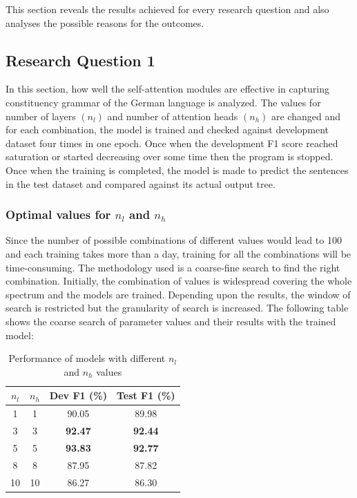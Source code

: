 \documentclass[a4paper, 11pt]{article}
\begin{document}
This section reveals the results achieved for every research question and also analyses the possible reasons for the outcomes.

\subsection{Research Question 1}

In this section, how well the self-attention modules are effective in capturing constituency grammar of the German language is analyzed. The values for number of layers $(n_l)$ and number of attention heads $(n_h)$ are changed and for each combination, the model is trained and checked against development dataset four times in one epoch. Once when the development F1 score reached saturation or started decreasing over some time then the program is stopped. Once when the training is completed, the model is made to predict the sentences in the test dataset and compared against its actual output tree. 

\subsubsection{Optimal values for $n_l$ and $n_h$}

Since the number of possible combinations of different values would lead to 100 and each training takes more than a day, training for all the combinations will be time-consuming. The methodology used is a coarse-fine search to find the right combination. Initially, the combination of values is widespread covering the whole spectrum and the models are trained. Depending upon the results, the window of search is restricted but the granularity of search is increased. The following table shows the coarse search of parameter values and their results with the trained model:

\begin{table}[h!]
  \begin{center}
    \label{tab:coarse_search_for_layers_heads}
    \def\arraystretch{1.5}%
    \begin{tabular}{c|c|c|c}
      \textbf{$n_l$} & \textbf{$n_h$} & Dev F1 (\%) & Test F1 (\%) \\
      \hline
      1 & 1 & 90.05 & 89.98\\
      3 & 3 & \textbf{92.47} & \textbf{92.44}\\
      5 & 5 & \textbf{93.83} & \textbf{92.77}\\
      8 & 8 & 87.95 & 87.82\\
      10 & 10 & 86.27 & 86.30\\
    \end{tabular}
    \caption{Performance of models with different $n_l$ and $n_h$ values}
  \end{center}
\end{table}
\end{document}
